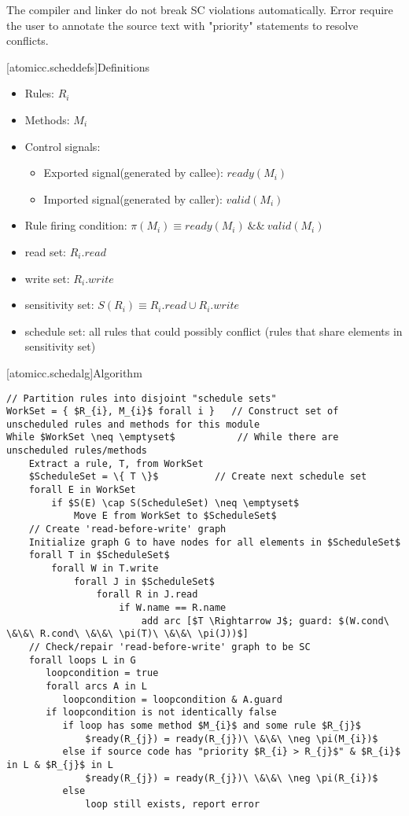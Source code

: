 The compiler and linker do not break SC violations automatically. Error require the user to annotate
the source text with "priority" statements to resolve conflicts.

[atomicc.scheddefs]{Definitions}
\begin{itemize}
\item Rules: $R_{i}$
\item Methods: $M_{i}$
\item Control signals:
\begin {itemize}
\item Exported signal(generated by callee):  $ready(M_{i})$
\item Imported signal(generated by caller):  $valid(M_{i})$
\end{itemize}
\item Rule firing condition: $\pi(M_{i}) \equiv ready(M_{i})\ \&\&\ valid(M_{i})$
\item read set: $R_{i}.read$
\item write set: $R_{i}.write$
\item sensitivity set: $S(R_{i}) \equiv R_{i}.read \cup R_{i}.write$
\item schedule set: all rules that could possibly conflict (rules that share elements in sensitivity set)
\end{itemize}
\pagebreak
{}[atomicc.schedalg]{Algorithm}

\begin{lstlisting}[mathescape=true]
// Partition rules into disjoint "schedule sets"
WorkSet = { $R_{i}, M_{i}$ forall i }   // Construct set of unscheduled rules and methods for this module
While $WorkSet \neq \emptyset$           // While there are unscheduled rules/methods
    Extract a rule, T, from WorkSet
    $ScheduleSet = \{ T \}$          // Create next schedule set
    forall E in WorkSet
        if $S(E) \cap S(ScheduleSet) \neq \emptyset$
            Move E from WorkSet to $ScheduleSet$
    // Create 'read-before-write' graph
    Initialize graph G to have nodes for all elements in $ScheduleSet$
    forall T in $ScheduleSet$
        forall W in T.write
            forall J in $ScheduleSet$
                forall R in J.read
                    if W.name == R.name
                        add arc [$T \Rightarrow J$; guard: $(W.cond\ \&\&\ R.cond\ \&\&\ \pi(T)\ \&\&\ \pi(J))$]
    // Check/repair 'read-before-write' graph to be SC
    forall loops L in G
       loopcondition = true
       forall arcs A in L 
          loopcondition = loopcondition & A.guard
       if loopcondition is not identically false
          if loop has some method $M_{i}$ and some rule $R_{j}$
              $ready(R_{j}) = ready(R_{j})\ \&\&\ \neg \pi(M_{i})$
          else if source code has "priority $R_{i} > R_{j}$" & $R_{i}$ in L & $R_{j}$ in L
              $ready(R_{j}) = ready(R_{j})\ \&\&\ \neg \pi(R_{i})$
          else
              loop still exists, report error
\end{lstlisting}


